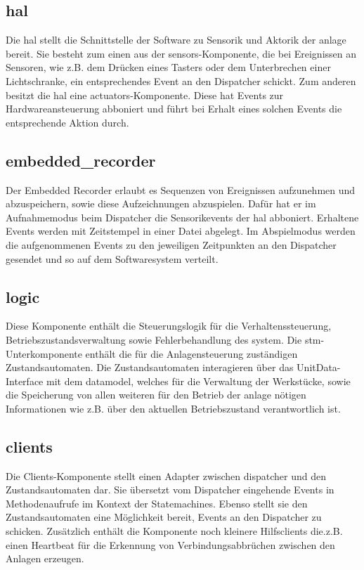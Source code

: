 \subsection{hal}\label{subsec:hal}
Die hal stellt die Schnittstelle der Software zu Sensorik und Aktorik der \gls{anlage} bereit. 
Sie besteht zum einen aus der sensors-Komponente, die bei Ereignissen an Sensoren, wie z.B. 
dem Drücken eines Tasters oder dem Unterbrechen einer Lichtschranke,
ein entsprechendes Event an den Dispatcher schickt.
Zum anderen besitzt die hal eine actuators-Komponente.
Diese hat Events zur Hardwareansteuerung abboniert und führt bei Erhalt eines solchen Events die entsprechende Aktion durch.

\subsection{embedded\_recorder}\label{subsec:embedded_recorder}
Der Embedded Recorder erlaubt es Sequenzen von Ereignissen aufzunehmen und abzuspeichern, sowie diese Aufzeichnungen abzuspielen.
Dafür hat er im Aufnahmemodus beim Dispatcher die Sensorikevents der hal abboniert. 
Erhaltene Events werden mit Zeitstempel in einer Datei abgelegt.
Im Abspielmodus werden die aufgenommenen Events zu den jeweiligen Zeitpunkten an den Dispatcher gesendet und so auf dem Softwaresystem verteilt.

\subsection{logic}\label{subsec:logic}
Diese Komponente enthält die Steuerungslogik für die Verhaltenssteuerung, Betriebszustandsverwaltung sowie Fehlerbehandlung des \gls{system}.
Die stm-Unterkomponente enthält die für die Anlagensteuerung zuständigen Zustandsautomaten. Die Zustandsautomaten interagieren über das 
UnitData-Interface mit dem datamodel, welches für die Verwaltung der Werkstücke, sowie die Speicherung von allen weiteren für den Betrieb der \gls{anlage} nötigen
Informationen wie z.B. über den aktuellen Betriebszustand verantwortlich ist. 

\subsection{clients}\label{subsec:clients}
Die Clients-Komponente stellt einen Adapter zwischen dispatcher und den Zustandsautomaten dar. 
Sie übersetzt vom Dispatcher eingehende Events in Methodenaufrufe im Kontext der Statemachines.
Ebenso stellt sie den Zustandsautomaten eine Möglichkeit bereit, Events an den Dispatcher zu schicken.
Zusätzlich enthält die Komponente noch kleinere Hilfsclients die.z.B. einen Heartbeat für die Erkennung
von Verbindungsabbrüchen zwischen den Anlagen erzeugen.

